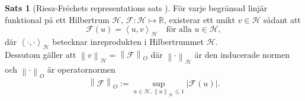 \documentclass[a4paper, 12pt]{report}
\theoremstyle{definition}
\newtheorem{thm}{Sats}[section]
\theoremstyle{remark}
\begin{document}
\begin{thm}[Riesz-Fréchets representations sats \cite{Young}]
	För varje begränsad linjär funktional på ett Hilbertrum $\mathcal{H}$, $\mathcal{F}: \mathcal{H} \longmapsto \mathbb{R}$, existerar ett unikt $v\in\mathcal{H}$ sådant att
	\begin{equation}
		\mathcal{F}\left(u\right)=\left\langle u, v\right\rangle_\mathcal{H}\quad \text{för alla }u\in\mathcal{H}, %
	\end{equation}
	där $\left\langle \cdot, \cdot\right\rangle_\mathcal{H}$ betecknar inreprodukten i Hilbertrummet $\mathcal{H}$.\\
	Dessutom gäller att $\left\| v \right\|_\mathcal{H}=\left\| \mathcal{F}\right\|_O$ där $\left\| \cdot \right\|_\mathcal{H}$ är den inducerade normen och $\left\|\cdot\right\|_O$ är operatornormen \begin{equation*}
	\left\|\mathcal{F}\right\|_O:=\sup_{u\in\mathcal{H},\left\|u\right\|_\mathcal{H}\leq 1}\left|\mathcal{F}\left(u\right)\right|.
	\end{equation*}
\end{thm}
\end{document}
